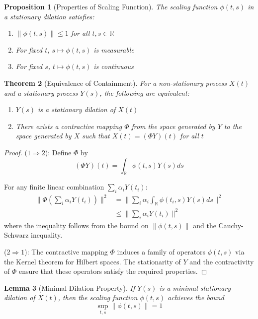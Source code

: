 \documentclass{article}
\newtheorem{theorem}{Theorem}
\newtheorem{lemma}[theorem]{Lemma}
\newtheorem{proposition}[theorem]{Proposition}
\begin{document}
\begin{proposition}[Properties of Scaling Function]
The scaling function $\phi(t,s)$ in a stationary dilation satisfies:
\begin{enumerate}
    \item $\|\phi(t,s)\| \leq 1$ for all $t,s \in \mathbb{R}$
    \item For fixed $t$, $s \mapsto \phi(t,s)$ is measurable
    \item For fixed $s$, $t \mapsto \phi(t,s)$ is continuous
\end{enumerate}
\end{proposition}

\begin{theorem}[Equivalence of Containment]
For a non-stationary process $X(t)$ and a stationary process $Y(s)$, the following are equivalent:
\begin{enumerate}
    \item $Y(s)$ is a stationary dilation of $X(t)$
    \item There exists a contractive mapping $\Phi$ from the space generated by $Y$ to the space generated by $X$ such that $X(t) = (\Phi Y)(t)$ for all $t$
\end{enumerate}
\end{theorem}

\begin{proof}
($1 \Rightarrow 2$): Define $\Phi$ by
\[ (\Phi Y)(t) = \int_{\mathbb{R}} \phi(t,s)Y(s)ds \]

For any finite linear combination $\sum_i \alpha_i Y(t_i)$:
\begin{align*}
\|\Phi(\sum_i \alpha_i Y(t_i))\|^2 &= \|\sum_i \alpha_i \int_{\mathbb{R}} \phi(t_i,s)Y(s)ds\|^2 \\
&\leq \|\sum_i \alpha_i Y(t_i)\|^2
\end{align*}
where the inequality follows from the bound on $\|\phi(t,s)\|$ and the Cauchy-Schwarz inequality.

($2 \Rightarrow 1$): The contractive mapping $\Phi$ induces a family of operators $\phi(t,s)$ via the Kernel theorem for Hilbert spaces. The stationarity of $Y$ and the contractivity of $\Phi$ ensure that these operators satisfy the required properties.
\end{proof}

\begin{lemma}[Minimal Dilation Property]
If $Y(s)$ is a minimal stationary dilation of $X(t)$, then the scaling function $\phi(t,s)$ achieves the bound
\[ \sup_{t,s} \|\phi(t,s)\| = 1 \]
\end{lemma}
\end{document}
